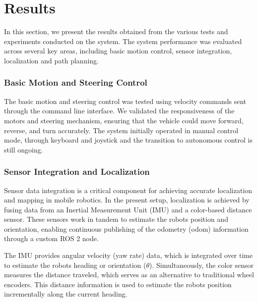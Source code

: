 \documentclass[english,project]{buwthesis}
\begin{document}
\chapter{Results}

In this section, we present the results obtained from the various tests and experiments conducted on the system. The system performance was evaluated across several key areas, including basic motion control, sensor integration, localization and path planning.

\subsection{Basic Motion and Steering Control}

The basic motion and steering control was tested using velocity commands sent through the command line interface. We validated the responsiveness of the motors and steering mechanism, ensuring that the vehicle could move forward, reverse, and turn accurately. The system initially operated in manual control mode, through keyboard and joystick and the transition to autonomous control is still ongoing.



\subsection{Sensor Integration and Localization}
Sensor data integration is a critical component for achieving accurate localization and mapping in mobile robotics. In the present setup, localization is achieved by fusing data from an Inertial Measurement Unit (IMU) and a color-based distance sensor. These sensors work in tandem to estimate the robot\textquotesingle s position and orientation, enabling continuous publishing of the odometry (odom) information through a custom ROS 2 node.

The IMU provides angular velocity (yaw rate) data, which is integrated over time to estimate the robot\textquotesingle s heading or orientation ($\theta$). Simultaneously, the color sensor measures the distance traveled, which serves as an alternative to traditional wheel encoders. This distance information is used to estimate the robot\textquotesingle s position incrementally along the current heading.
\end{document}
